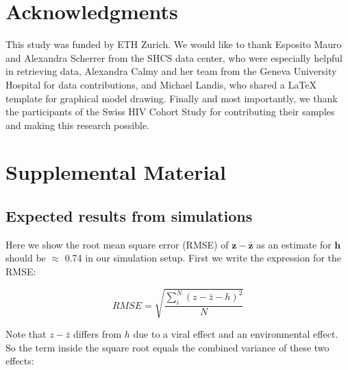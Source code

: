 \documentclass[]{article}
\newcommand{\beginsupplement}{%
	\setcounter{table}{0}
	\renewcommand{\thetable}{S\arabic{table}}%
	\setcounter{figure}{0}
	\renewcommand{\thefigure}{S\arabic{figure}}%
}
\begin{document}
\begin{doublespace}
\section{Acknowledgments}

This study was funded by ETH Zurich. We would like to thank Esposito Mauro and Alexandra Scherrer from the SHCS data center, who were especially helpful in retrieving data, Alexandra Calmy and her team from the Geneva University Hospital for data contributions, and Michael Landis, who shared a LaTeX template for graphical model drawing. Finally and most importantly, we thank the participants of the Swiss HIV Cohort Study for contributing their samples and making this research possible.




\newpage
\section{Supplemental Material}
\beginsupplement

\subsection{Expected results from simulations}

Here we show the root mean square error (RMSE) of $\bm{z} - \bm{\bar{z}}$ as an estimate for $\bm{h}$ should be $\approx$ 0.74 in our simulation setup. First we write the expression for the RMSE:

\begin{equation}
    RMSE = \sqrt{\frac{\sum_i^N(z - \bar{z} - h)^2}{N}}
\end{equation}

Note that $z - \bar{z}$ differs from $h$ due to a viral effect and an environmental effect. So the term inside the square root equals the combined variance of these two effects:


\end{doublespace}
\end{document}
